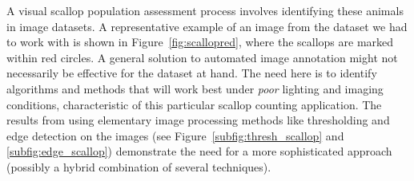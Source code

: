\documentclass {udthesis}
\begin{document}
A visual scallop population assessment process involves identifying these animals in image datasets.
A representative example of an image from the dataset we had to work with is shown in  Figure~\ref{fig:scallopred}, where the scallops are marked within red circles.
A general solution to automated image annotation might not necessarily be effective for the dataset at hand.
The need here is to identify algorithms and methods that will work best under \emph{poor} lighting and imaging conditions, characteristic of this particular scallop counting application. 
The results from using elementary image processing methods like thresholding and edge detection on the images (see Figure~\ref{subfig:thresh_scallop} and \ref{subfig:edge_scallop}) demonstrate the need for a more sophisticated approach (possibly a hybrid combination of several techniques).
\end{document}
